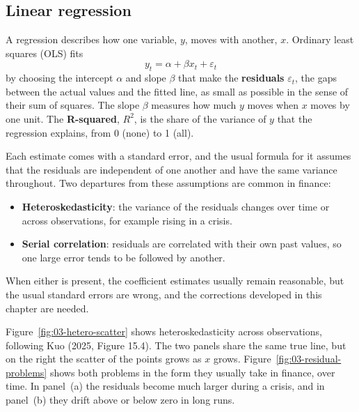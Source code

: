 \subsection{Linear regression}
\label{sec:03-regression}

A regression describes how one variable, $y$, moves with another, $x$. Ordinary least squares (OLS) fits
\begin{equation}
  y_t = \alpha + \beta x_t + \varepsilon_t
  \label{eq:03-ols}
\end{equation}
by choosing the intercept $\alpha$ and slope $\beta$ that make the \textbf{residuals} $\varepsilon_t$, the gaps between the actual values and the fitted line, as small as possible in the sense of their sum of squares. The slope $\beta$ measures how much $y$ moves when $x$ moves by one unit. The \textbf{R-squared}, $R^2$, is the share of the variance of $y$ that the regression explains, from 0 (none) to 1 (all).

Each estimate comes with a standard error, and the usual formula for it assumes that the residuals are independent of one another and have the same variance throughout. Two departures from these assumptions are common in finance:

\begin{itemize}
  \item \textbf{Heteroskedasticity}: the variance of the residuals changes over time or across observations, for example rising in a crisis.
  \item \textbf{Serial correlation}: residuals are correlated with their own past values, so one large error tends to be followed by another.
\end{itemize}

When either is present, the coefficient estimates usually remain reasonable, but the usual standard errors are wrong, and the corrections developed in this chapter are needed.

Figure~\ref{fig:03-hetero-scatter} shows heteroskedasticity across observations, following Kuo (2025, Figure 15.4). The two panels share the same true line, but on the right the scatter of the points grows as $x$ grows. Figure~\ref{fig:03-residual-problems} shows both problems in the form they usually take in finance, over time. In panel~(a) the residuals become much larger during a crisis, and in panel~(b) they drift above or below zero in long runs.

